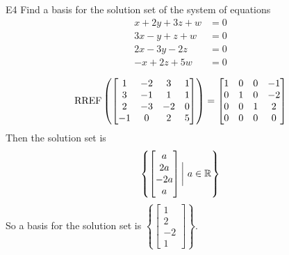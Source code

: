 \documentclass{sbgLAquiz}
\begin{document}
\begin{extract}\newpage\end{extract}
\begin{problem}{E4} 
Find a basis for the solution set of the system of equations
\begin{align*}
x+2y+3z+w &= 0 \\
3x-y+z+w &= 0 \\
2x-3y-2z &= 0 \\
-x+2z+5w &=0
\end{align*}
\end{problem}
\begin{solution}
$$\operatorname{RREF} \left(\begin{bmatrix} 1 & -2 & 3 & 1 \\ 3 & -1 & 1 & 1 \\ 2 & -3 & -2 & 0 \\ -1 & 0 & 2 & 5 \end{bmatrix} \right) = \begin{bmatrix} 1 & 0 & 0 & -1 \\ 0 & 1 & 0 & -2 \\ 0 & 0 & 1 & 2 \\ 0 & 0 & 0 & 0\end{bmatrix}$$
Then the solution set is
$$\left\{ \begin{bmatrix} a \\ 2a \\ -2a \\ a \end{bmatrix} \bigg |\ a \in \mathbb{R} \right\}$$
So a basis for the solution set is $\left\{\begin{bmatrix} 1 \\ 2 \\ -2 \\ 1\end{bmatrix} \right\}$.
\end{solution}
\end{document}
